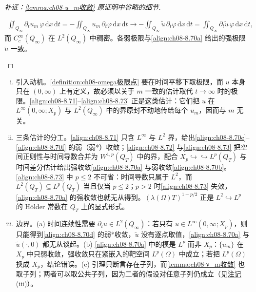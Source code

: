 \documentclass[../../main.tex]{subfiles}%
\begin{document}
\begin{proof}[补证：\cref{lemma:ch08-u_m收敛} 原证明中省略的细节]
\begin{enumerate}[(i)]
\begin{align*}
\iint_{Q_\infty}\partial_t u_m\,\varphi\,\mathrm{d}x\,\mathrm{d}t
=-\iint_{Q_\infty}u_m\,\partial_t\varphi\,\mathrm{d}x\,\mathrm{d}t
\to-\iint_{Q_\infty}\tilde u\,\partial_t\varphi\,\mathrm{d}x\,\mathrm{d}t
=\iint_{Q_\infty}\partial_t\tilde u\,\varphi\,\mathrm{d}x\,\mathrm{d}t,
\end{align*}
而 $C_c^\infty(Q_\infty)$ 在 $L^2(Q_\infty)$ 中稠密。各弱极限与\eqref{align:ch08-8.70a} 给出的强极限 $\tilde u$ 一致。
\end{enumerate}
\end{proof}

\begin{remark}\label{remark:ch08-u_m收敛}
\begin{enumerate}[(i)]
\item 引入动机。\cref{definition:ch08-omega极限点} 要在时间平移下取极限，而 $u$ 本身只在 $(0,\infty)$ 上有定义，故必须以关于 $m$ 一致的估计取代 $t\to\infty$ 时的极限。\eqref{align:ch08-8.71}--\eqref{align:ch08-8.73} 正是这类估计：它们把 $u$ 在 $L^\infty(0,\infty;X_p)$ 与 $L^2(Q_\infty)$ 中的界原封不动地传给每个 $u_m$，因而与 $m$ 无关。
\item 三条估计的分工。\eqref{align:ch08-8.71} 只含 $L^\infty$ 与 $L^2$ 界，给出\eqref{align:ch08-8.70c}--\eqref{align:ch08-8.70f} 的弱（弱*）收敛；\eqref{align:ch08-8.72} 与\eqref{align:ch08-8.73} 把空间正则性与时间导数合并为 $W^{1,p}(Q_T)$ 中的界，配合 $X_p\hookrightarrow\hookrightarrow L^p(Q_T)$ 与时间差分估计给出强收敛\eqref{align:ch08-8.70a} 与弱收敛\eqref{align:ch08-8.70b}。\eqref{align:ch08-8.73} 中 $p\leqslant2$ 不可省：时间导数只属于 $L^2$，而 $L^2(Q_T)\subseteq L^p(Q_T)$ 当且仅当 $p\leqslant2$；$p>2$ 时\eqref{align:ch08-8.73} 失效，\eqref{align:ch08-8.70a} 的强收敛也就无从得到。$(\lambda(\Omega)T)^{1-p/2}$ 正是 $L^2\hookrightarrow L^p$ 的 Hölder 常数在 $Q_T$ 上的显式形式。
\item 边界。(a) 时间连续性需要 $\partial_t u\in L^2(Q_\infty)$：若只有 $u\in L^\infty(0,\infty;X_p)$，则只能得到\eqref{align:ch08-8.70d} 的弱*收敛，$\tilde u$ 没有逐点取值，\eqref{align:ch08-8.70a} 与 $\tilde u(\cdot,0)$ 都无从谈起。(b) \eqref{align:ch08-8.70a} 中的模是 $L^p$ 而非 $X_p$：$\{u_m\}$ 在 $X_p$ 中只弱收敛，强收敛只在紧嵌入的靶空间 $L^p(\Omega)$ 中成立；若把 $L^p(\Omega)$ 换成 $X_p$，结论错误。(c) 引理只断言存在子列，而\cref{lemma:ch08-ν_m收敛} 也取子列；两者可以取公共子列，因为二者的假设对任意子列仍成立（见\hyperref[remark:ch08-ν_m收敛]{注记}(iii)）。
\end{enumerate}
\end{remark}
\end{document}
